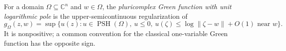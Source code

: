 
For a domain $\Omega\subseteq\mathbb C^n$ and $w\in\Omega$, the \emph{pluricomplex Green function with unit logarithmic pole} is the upper-semicontinuous regularization of
\[
g_\Omega(z,w)=\sup\{u(z):u\in\operatorname{PSH}(\Omega),\ u\le0,\ u(\zeta)\le\log\|\zeta-w\|+O(1)\text{ near }w\}.
\]
It is nonpositive; a common convention for the classical one-variable Green function has the opposite sign.

